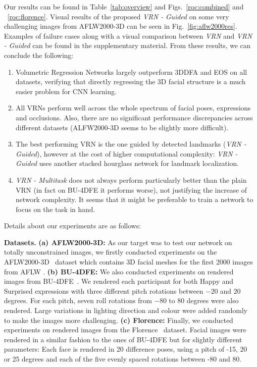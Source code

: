 Our results can be found in Table~\ref{tab:overview} and
Figs.~\ref{roc:combined} and ~\ref{roc:florence}.
Visual results of the proposed \textit{VRN - Guided} on some very
challenging images from AFLW2000-3D can be seen in
Fig.~\ref{fig:aflw2000res}. Examples of failure cases along with a visual comparison between \textit{VRN} and \textit{VRN - Guided} can be found in the supplementary material. From these results, we can conclude the
following:
\begin{enumerate}
\item
Volumetric Regression Networks largely outperform 3DDFA and EOS on all datasets, verifying that directly regressing the 3D facial structure is a much easier problem for CNN learning.
\item
All VRNs perform well across the whole spectrum of facial poses, expressions and occlusions. Also, there are no significant performance discrepancies across different datasets (ALFW2000-3D seems to be slightly more difficult).
\item The best performing VRN is the one guided by detected landmarks
  (\textit{VRN - Guided}), however at the cost of higher computational
  complexity: \textit{VRN - Guided} uses another stacked hourglass network for
  landmark localization.
\item
\textit{VRN - Multitask} does not always perform particularly better than the plain VRN (in fact on BU-4DFE it performs worse), not justifying the increase of network complexity. It seems that it might be preferable to train a network to focus on the task in hand.
\end{enumerate}



\noindent{}Details about our experiments are as follows:

\textbf{Datasets.} \textbf{(a) AFLW2000-3D:} As our target
was to test our network on totally unconstrained images, we firstly
conducted experiments on the AFLW2000-3D~\cite{zhu2016face} dataset
which contains 3D facial meshes for the first 2000 images from AFLW
\cite{aflw2011}. \textbf{(b) BU-4DFE:} We also conducted
experiments on rendered images from BU-4DFE~\cite{yin2008high}. We
rendered each participant for both Happy and Surprised expressions
with three different pitch rotations between $-20$ and $20$
degrees. For each pitch, seven roll rotations from $-80$ to $80$
degrees were also rendered. Large variations in lighting direction and
colour were added randomly to make the images more challenging.   \textbf{(c) Florence:} Finally,
we conducted experiments on rendered images from the
Florence~\cite{masi2d3dFaceData} dataset. Facial images were rendered
in a similar fashion to the ones of BU-4DFE but for slightly different
parameters: Each face is rendered in 20 difference poses, using a
pitch of -15, 20 or 25 degrees and each of the five evenly spaced
rotations between -80 and 80.

